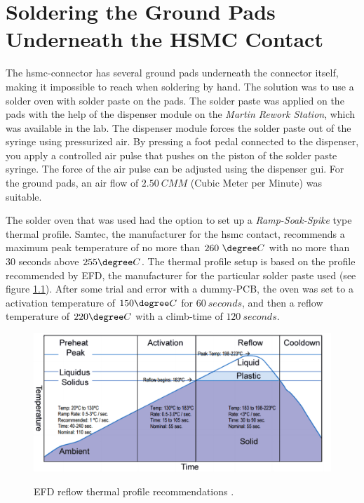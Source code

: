 \documentclass[main.tex]{subfiles}
\begin{document}
\chapter{Soldering the Ground Pads Underneath the HSMC Contact} \label{ap:solder}

The \gls{hsmc}-connector has several ground pads underneath the connector itself, making it impossible to reach when soldering by hand. The solution was to use a solder oven with solder paste on the pads. The solder paste was applied on the pads with the help of the dispenser module on the \textit{Martin Rework Station}, which was available in the lab. The dispenser module forces the solder paste out of the syringe using pressurized air. By pressing a foot pedal connected to the dispenser, you apply a controlled air pulse that pushes on the piston of the solder paste syringe. The force of the air pulse can be adjusted using the dispenser \acrshort{gui}. For the ground pads, an air flow of $2.50~CMM$ (Cubic Meter per Minute) was suitable.

The solder oven that was used had the option to set up a \textit{Ramp-Soak-Spike} type thermal profile. Samtec, the manufacturer for the \gls{hsmc} contact, recommends a maximum peak temperature of no more than $260~\degree C$ with no more than 30 seconds above $255\degree C$. The thermal profile setup is based on the profile recommended by EFD, the manufacturer for the particular solder paste used (see figure \ref{fig:krepro}). After some trial and error with a dummy-PCB, the oven was set to a activation temperature of $150\degree C$ for $60~seconds$, and then a reflow temperature of $220\degree C$ with a climb-time of $120~seconds$. 

\begin{figure}[H] %
\includegraphics[width=0.8\linewidth]{../img/temp_prof}  \\[0.1 cm]
\caption{EFD reflow thermal profile recommendations \cite{krepro_reflow}.}
\label{fig:krepro}
\end{figure}
\end{document}
